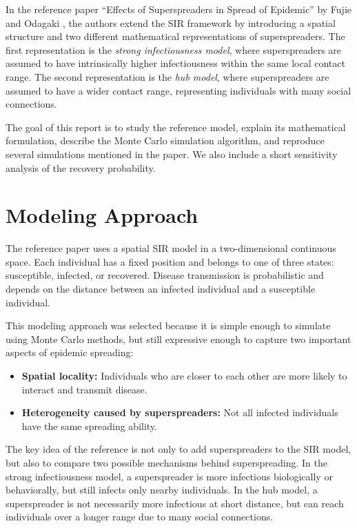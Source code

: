 \documentclass[11pt,a4paper]{article}
\begin{document}
In the reference paper ``Effects of Superspreaders in Spread of Epidemic'' by Fujie and Odagaki \cite{fujie2007}, the authors extend the SIR framework by introducing a spatial structure and two different mathematical representations of superspreaders. The first representation is the \textit{strong infectiousness model}, where superspreaders are assumed to have intrinsically higher infectiousness within the same local contact range. The second representation is the \textit{hub model}, where superspreaders are assumed to have a wider contact range, representing individuals with many social connections.

The goal of this report is to study the reference model, explain its mathematical formulation, describe the Monte Carlo simulation algorithm, and reproduce several simulations mentioned in the paper. We also include a short sensitivity analysis of the recovery probability.

\section{Modeling Approach}

The reference paper uses a spatial SIR model in a two-dimensional continuous space. Each individual has a fixed position and belongs to one of three states: susceptible, infected, or recovered. Disease transmission is probabilistic and depends on the distance between an infected individual and a susceptible individual.

This modeling approach was selected because it is simple enough to simulate using Monte Carlo methods, but still expressive enough to capture two important aspects of epidemic spreading:

\begin{itemize}[leftmargin=2em]
    \item \textbf{Spatial locality:} Individuals who are closer to each other are more likely to interact and transmit disease.
    \item \textbf{Heterogeneity caused by superspreaders:} Not all infected individuals have the same spreading ability.
\end{itemize}

The key idea of the reference is not only to add superspreaders to the SIR model, but also to compare two possible mechanisms behind superspreading. In the strong infectiousness model, a superspreader is more infectious biologically or behaviorally, but still infects only nearby individuals. In the hub model, a superspreader is not necessarily more infectious at short distance, but can reach individuals over a longer range due to many social connections.
\end{document}
